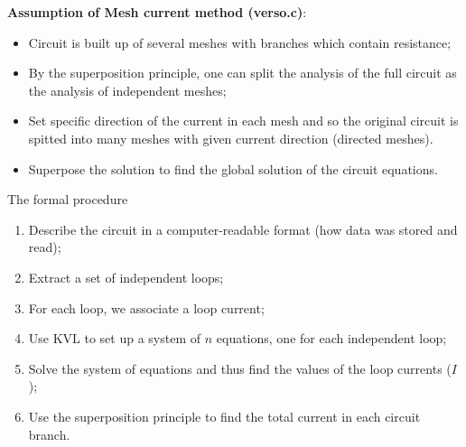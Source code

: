 \documentclass[xcolor=dvipsnames]{beamer}
\begin{document}
\begin{frame}
\textbf{Assumption of Mesh current method (verso.c)}:
\begin{itemize}
	\item Circuit is built up of several meshes with branches which contain resistance;
	\item By the superposition principle, one can split the analysis of the full circuit as the analysis of independent meshes;
	\item Set specific direction of the current in each mesh and so the original circuit is spitted into many meshes with given current direction (directed meshes).
	\item Superpose the solution to find the global solution of the circuit equations.
\end{itemize}

\end{frame}


\begin{frame}{The formal procedure}
\begin{enumerate}
	\item Describe the circuit in a computer-readable format (how data was stored and read);
	\item Extract a set of independent loops;
	\item For each loop, we associate a loop current;
	\item Use KVL to set up a system of $n$ equations, one for each independent loop;
	\item Solve the system of equations and thus find the values of the loop currents ($I$);
	\item Use the superposition principle to find the total current in each circuit branch.
\end{enumerate}
\end{frame}
\end{document}

